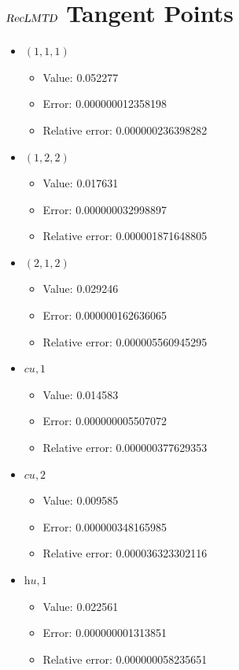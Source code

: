 \documentclass{article}%
\begin{document}
\section{$\textsl{RecLMTD}$ Tangent Points}%
\thispagestyle{plain}%
\begin{itemize}%
	\item $(1, 1, 1)$%
	\begin{itemize}%
		\item Value: 0.052277%
		\item Error: 0.000000012358198%
		\item Relative error: 0.000000236398282%
	\end{itemize}%
	\item $(1, 2, 2)$%
	\begin{itemize}%
		\item Value: 0.017631%
		\item Error: 0.000000032998897%
		\item Relative error: 0.000001871648805%
	\end{itemize}%
	\item $(2, 1, 2)$%
	\begin{itemize}%
		\item Value: 0.029246%
		\item Error: 0.000000162636065%
		\item Relative error: 0.000005560945295%
	\end{itemize}%
	\item $\textit{cu},1$%
	\begin{itemize}%
		\item Value: 0.014583%
		\item Error: 0.000000005507072%
		\item Relative error: 0.000000377629353%
	\end{itemize}%
	\item $\textit{cu},2$%
	\begin{itemize}%
		\item Value: 0.009585%
		\item Error: 0.000000348165985%
		\item Relative error: 0.000036323302116%
	\end{itemize}%
	\item $\textit{hu},1$%
	\begin{itemize}%
		\item Value: 0.022561%
		\item Error: 0.000000001313851%
		\item Relative error: 0.000000058235651%
	\end{itemize}%
\end{itemize}%
\end{document}
